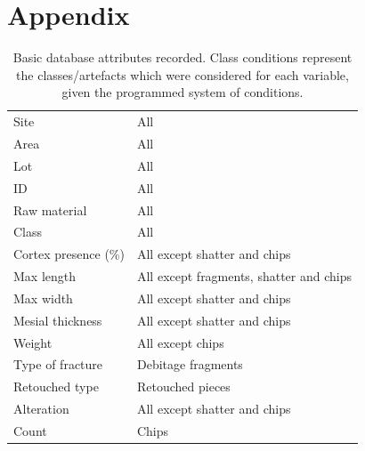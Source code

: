 \documentclass[12pt,twoside]{reedthesis}
\begin{document}
\hypertarget{appendix}{%
\chapter{Appendix}\label{appendix}}
\begin{table}

\caption{\label{tab:unnamed-chunk-53}Basic database attributes recorded. Class conditions represent the classes/artefacts which were considered for each variable, given the programmed system of conditions.}
\centering
\begin{tabular}[t]{>{\raggedright\arraybackslash}p{5cm}>{\raggedright\arraybackslash}p{5cm}}
\toprule
\multicolumn{1}{>{\centering\arraybackslash}p{5cm}}{\textbf{Recorded variables}} & \multicolumn{1}{>{\centering\arraybackslash}p{5cm}}{\textbf{Class conditions}}\\
\midrule
Site & All\\
Area & All\\
Lot & All\\
ID & All\\
Raw material & All\\
\addlinespace
Class & All\\
Cortex presence (\%) & All except shatter and chips\\
Max length & All except fragments, shatter and chips\\
Max width & All except shatter and chips\\
Mesial thickness & All except shatter and chips\\
\addlinespace
Weight & All except chips\\
Type of fracture & Debitage fragments\\
Retouched type & Retouched pieces\\
Alteration & All except shatter and chips\\
Count & Chips\\
\bottomrule
\end{tabular}
\end{table}
\end{document}
